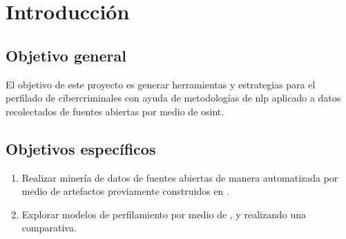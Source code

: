 \chapter{Introducción} %

\label{chIntroduction} %


\section{Objetivo general}
El objetivo de este proyecto es generar herramientas y estrategias para el perfilado de cibercriminales con ayuda de metodologías de \gls{nlp} aplicado a datos recolectados de fuentes abiertas por medio de \gls{osint}.

\section{Objetivos específicos}
\begin{enumerate}
\item Realizar minería de datos de fuentes abiertas de manera automatizada por medio de artefactos previamente construidos en \cite{osint}.
  
\item Explorar modelos de perfilamiento por medio de ,  y  realizando una comparativa.

\end{enumerate}
